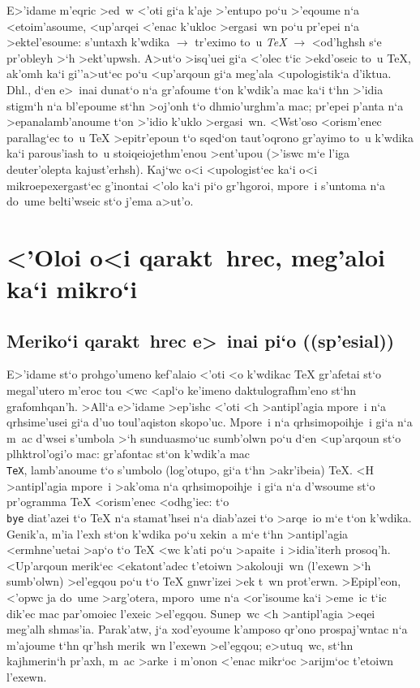 E>'idame m'eqric >ed~w <'oti gi`a k'aje >'entupo po`u >'eqoume n`a 
<etoim'asoume, <up'arqei <'enac k'ukloc >ergasi~wn po`u pr'epei n`a     
>ektel'esoume: {\tengs s'untaxh k'wdika $\to$ tr'eximo to~u {\sl\TeX}
$\to$ <od'hghsh s`e pr'o\-ble\-yh >`h >ekt'upwsh}. A>ut`o >isq'uei gi`a
<'olec t`ic >ekd'oseic to~u {\rm\TeX}, ak'omh ka`i gi''\NB a>ut`ec po`u
<up'arqoun gi`a meg'ala <upologistik`a d'iktua.  Dhl., d`en e>~inai
dunat`o n`a gr'afoume t`on k'wdik'a mac ka`i t`hn >'idia stigm`h n`a
bl'epoume st`hn >oj'onh t`o dhmio'ur\-ghm'a mac; pr'epei p'anta n`a
>epa\-na\-lam\-b'anoume t`on >'idio k'uklo >ergasi~wn.  <Wst'oso
<orism'enec parallag`ec to~u {\rm \TeX} >epitr'epoun t`o sqed`on
taut'oqrono gr'ayimo to~u k'wdika ka`i parous'iash to~u
stoiqeiojethm'enou >ent'upou (>'iswc m`e l'iga deute\-r'olepta
kaju\-st'erhsh).  Kaj`wc o<i <upologist`ec ka`i o<i
mikro\-epexer\-gast`ec g'inontai <'olo ka`i pi`o gr'hgoroi, mpore~i
s'untoma n`a do~ume belti'wseic st`o j'ema a>ut'o.

\section{<'Oloi o<i qarakt~hrec, meg'aloi ka`i mikro`i}

\subsection{Meriko`i qarakt~hrec e>~inai pi`o ((sp'esial))}

E>'idame st`o prohgo'umeno kef'alaio <'oti <o k'wdikac {\rm \TeX}
gr'afetai st`o megal'utero m'eroc tou <wc <apl`o ke'imeno
daktulo\-grafh\-m'eno st`hn grafo\-mhqa\-n'h.  >All`a e>'idame >ep'ishc
<'oti <h >antipl'agia mpore~i n`a qrhsime'usei gi`a d'uo toul'aqiston
skopo'uc. Mpore~i n`a qrhsimopoihje~i gi`a n`a m~ac d'wsei s'umbola >`h
sunduasmo`uc sumb'olwn po`u d`en <up'ar\-qoun st`o plhktrol'ogi'o mac:
gr'afontac st`on k'wdik'a mac {\tt \\TeX}, lamb'anoume t`o s'umbolo
(log'otupo, gi`a t`hn >akr'ibeia) {\rm \TeX}\null.  <H >anti\-pl'agia
mpore~i >ak'oma n`a qrhsimopoihje~i gi`a n`a d'wsoume st`o pr'ogramma
{\rm \TeX} <orism'enec <odhg'iec: t`o {\tt \\bye} diat'azei t`o {\rm
\TeX} n`a stamat'hsei n`a diab'azei t`o >arqe~io m`e t`on k'wdika. 
Genik'a, m'ia l'exh st`on k'wdika po`u xekin~a m`e t`hn >antipl'agia
<ermhne'uetai >ap`o t`o {\rm \TeX} <wc k'ati po`u >apaite~i
>idia'i\-terh prosoq'h.  <Up'arqoun merik`ec <ekaton\-t'adec t'etoiwn
>akolouji~wn (l'exewn >`h sumb'olwn) >el'egqou po`u t`o {\rm \TeX}
gnwr'izei >ek t~wn prot'erwn. >Epi\-pl'eon, <'opwc ja do~ume >arg'otera,
mporo~ume n`a <or'isoume ka`i >eme~ic t`ic dik'ec mac par'omoiec l'exeic
>el'egqou.  Sunep~wc <h >anti\-pl'agia >eqei meg'alh shmas'ia. 
Parak'atw, j`a xod'e\-youme k'amposo qr'ono prospaj'wntac n`a m'ajoume
t`hn qr'hsh merik~wn l'exewn  >el'egqou; e>utuq~wc, st`hn kajhmerin`h
pr'axh, m~ac >arke~i m'onon <'enac mikr`oc >arij\-m`oc t'etoiwn l'exewn.

